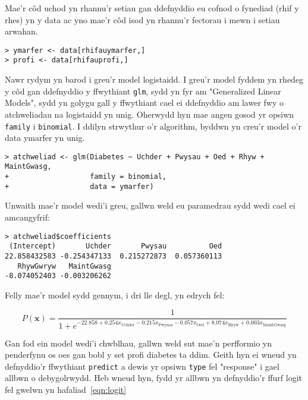Mae'r c\^{o}d uchod yn rhannu'r setiau gan ddefnyddio eu cofnod o fynediad (rhif y rhes) yn y data ac yno mae'r c\^{o}d isod yn rhannu'r fectorau i mewn i setiau arwahan.  %

\begin{verbatim}
> ymarfer <- data[rhifauymarfer,] 
> profi <- data[rhifauprofi,]
\end{verbatim}

Nawr rydym yn barod i greu'r model logistaidd. I greu'r model fyddem yn rhedeg y c\^{o}d gan ddefnyddio y ffwythiant \texttt{glm}, sydd yn fyr am "Generalized Linear Models", sydd yn golygu gall y ffwythiant cael ei ddefnyddio am lawer fwy o atchweliadau na logistaidd yn unig. Oherwydd hyn mae angen gosod yr opsiwn \texttt{family} i \texttt{binomial}. I ddilyn strwythur o'r algorithm, byddwn yn creu'r model o'r data ymarfer yn unig. 

\begin{verbatim}
> atchweliad <- glm(Diabetes ~ Uchder + Pwysau + Oed + Rhyw + MaintGwasg,
+                   family = binomial,
+                   data = ymarfer)
\end{verbatim}

Unwaith mae'r model wedi'i greu, gallwn weld eu paramedrau sydd wedi cael ei amcangyfrif:

\begin{verbatim}
> atchweliad$coefficients
 (Intercept)       Uchder       Pwysau          Oed 
22.858432583 -0.254347133  0.215272873  0.057360113 
   RhywGwryw   MaintGwasg 
-8.074052403 -0.003206262 
\end{verbatim}

Felly mae'r model sydd gennym, i dri lle degl, yn edrych fel:

$$ P(\mathbf{x}) = \frac{1}{1 + e^{-22.858 + 0.254 x_{\text{Uchder}} - 0.215 x_{\text{Pwysau}} - 0.057 x_{\text{Oed}} + 8.074 x_{\text{Rhyw}} + 0.003 x_{\text{MaintGwasg}}}} $$

Gan fod ein model wedi'i chwblhau, gallwn weld sut mae'n perfformio yn penderfynu os oes gan bobl y set profi diabetes ta ddim. Geith hyn ei wneud yn defnyddio'r ffwythiant \texttt{predict} a dewis yr opsiwn \texttt{type} fel "response" i gael allbwn o debygolrwydd. Heb wneud hyn, fydd yr allbwn yn defnyddio'r ffurf logit fel gwelwn yn hafaliad~\ref{eqn:logit} %

